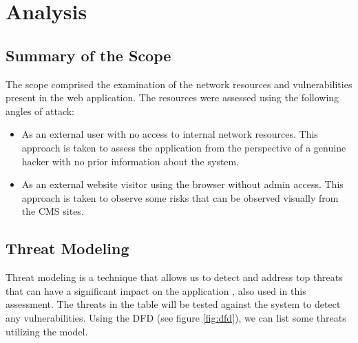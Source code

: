 \chapter{Analysis}
\section{Summary of the Scope}
The scope comprised the examination of the network resources and vulnerabilities present in the web application. The resources were assessed using the following angles of attack:
\begin{itemize}
    \item As an external user with no access to internal network resources. This approach is taken to assess the application from the perspective of a genuine hacker with no prior information about the system.
    \item As an external website visitor using the browser without admin access. This approach is taken to observe some risks that can be observed visually from the CMS sites.
\end{itemize}

\section{Threat Modeling}
Threat modeling is a technique that allows us to detect and address top threats that can have a significant impact on the application \citep{threat_modeling}, also used in this assessment. The threats in the table will be tested against the system to detect any vulnerabilities.
Using the DFD (see figure \ref{fig:dfd}), we can list some threats utilizing the model.

